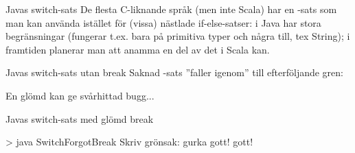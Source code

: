 \begin{Slide}{Javas switch-sats}\SlideFontSmall
De flesta C-liknande språk (men inte Scala) har en -sats som man kan använda istället för (vissa) nästlade if-else-satser:
{\SlideFontTiny
{} i Java har stora begränsningar (fungerar t.ex. bara på primitiva typer och några till, tex String); i framtiden planerar man att anamma en del av det  i Scala kan.
}
\end{Slide}


\begin{Slide}{Javas switch-sats utan break}\SlideFontSmall
Saknad -sats ''faller igenom'' till efterföljande gren:

En glömd  kan ge svårhittad bugg...
\end{Slide}

\begin{Slide}{Javas switch-sats med glömd break}\SlideFontSmall

\vspace{-0.5em}

\vspace{-0.7em}\pause
\begin{REPLsmall}
> java SwitchForgotBreak
Skriv grönsak:
gurka
gott!
gott!
\end{REPLsmall}

\end{Slide}



